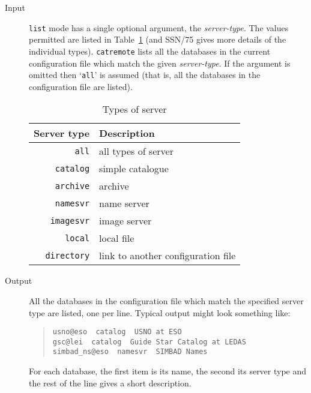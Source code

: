\documentclass[twoside,11pt]{article}
\newcommand{\xref}[3]{#1}
\renewcommand{\_}{\texttt{\symbol{95}}}
\begin{document}
\begin{description}

  \item[Input] {\tt list} mode has a single optional argument, the
   {\it server-type}.  The values permitted are listed in
   Table~\ref{SERVTYPES} (and \xref{SSN/75}{ssn75}{}\cite{SSN75} gives
   more details of the individual types).  {\tt catremote} lists all the
   databases in the current configuration file which match the given
   {\it server-type}.  If the argument is omitted then `{\tt all}' is
   assumed (that is, all the databases in the configuration file are
   listed).

\begin{table}[htbp]

\begin{center}
\begin{tabular}{rl}
Server type     & Description \\ \hline
{\tt all}       & all types of server \\
{\tt catalog}   & simple catalogue \\
{\tt archive}   & archive \\
{\tt namesvr}   & name server \\
{\tt imagesvr}  & image server \\
{\tt local}     & local file \\
{\tt directory} & link to another configuration file \\
\end{tabular}
\end{center}

\caption{Types of server \label{SERVTYPES} }

\end{table}

  \item[Output] All the databases in the configuration file which match
   the specified server type are listed, one per line.  Typical output
   might look something like:

  \begin{quote}
   \verb+usno@eso  catalog  USNO at ESO+ \\
   \verb+gsc@lei  catalog  Guide Star Catalog at LEDAS+ \\
   \verb+simbad_ns@eso  namesvr  SIMBAD Names+
  \end{quote}

   For each database, the first item is its name, the second its server
   type and the rest of the line gives a short description.

\end{description}
\end{document}
